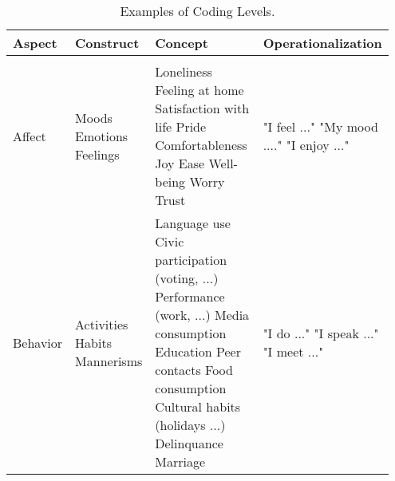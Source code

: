 \begin{table}%
\caption{Examples of Coding Levels.}
\label{tab:AspectExamples} 
\begin{tabular}{>{\raggedright\arraybackslash}p{0.15\linewidth} 
>{\raggedright\arraybackslash}p{0.20\linewidth} 
>{\raggedright\arraybackslash}p{0.35\linewidth} 
>{\raggedright\arraybackslash}p{0.25\linewidth}}
\hline 
Aspect & Construct & Concept & Operationalization \\ 
\hline \\ [-0.5em]
Affect & 
Moods \linebreak Emotions \linebreak Feelings \linebreak & 
Loneliness \linebreak Feeling at home \linebreak Satisfaction with life \linebreak Pride \linebreak Comfortableness \linebreak Joy \linebreak Ease \linebreak Well-being \linebreak Worry \linebreak Trust \linebreak & 
"I feel ..." \linebreak "My mood ...." \linebreak "I enjoy ..." \linebreak \\

Behavior & 
Activities \linebreak Habits \linebreak Mannerisms \linebreak & 
Language use \linebreak Civic participation (voting, ...) \linebreak Performance (work, ...) \linebreak Media consumption \linebreak Education \linebreak Peer contacts \linebreak Food consumption \linebreak Cultural habits (holidays ...) \linebreak Delinquance \linebreak Marriage \linebreak & 
"I do ..." \linebreak "I speak ..." \linebreak "I meet ..." \linebreak \\ 


\end{tabular}
\end{table}

